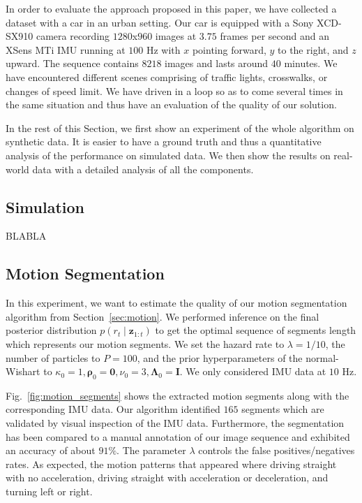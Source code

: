 In order to evaluate the approach proposed in this paper, we have collected
a dataset with a car in an urban setting. Our car is equipped with a Sony
XCD-SX910 camera recording $1280$x$960$ images at $3.75$ frames per second and
an XSens MTi IMU running at $100$ Hz with $x$ pointing forward, $y$ to the
right, and $z$ upward. The sequence contains $8218$ images and lasts around $40$
minutes. We have encountered different scenes comprising of traffic lights,
crosswalks, or changes of speed limit. We have driven in a loop so as to come
several times in the same situation and thus have an evaluation of the quality
of our solution.

In the rest of this Section, we first show an experiment of the whole algorithm
on synthetic data. It is easier to have a ground truth and thus a quantitative
analysis of the performance on simulated data. We then show the results on
real-world data with a detailed analysis of all the components.

\subsection{Simulation}
BLABLA

\subsection{Motion Segmentation}
In this experiment, we want to estimate the quality of our motion segmentation
algorithm from Section~\ref{sec:motion}. We performed inference on the
final posterior distribution $p(r_t\mid \mathbf{z}_{1:t})$ to get the optimal
sequence of segments length which represents our motion segments. We set the
hazard rate to $\lambda=1/10$, the number of particles to $P=100$, and the prior
hyperparameters of the normal-Wishart to $\kappa_0=1,
\boldsymbol{\rho}_0=\mathbf{0},\nu_0=3,\boldsymbol{\Lambda}_0=\mathbf{I}$. We
only considered IMU data at $10$ Hz.

Fig.~\ref{fig:motion_segments} shows the extracted motion segments along with
the corresponding IMU data. Our algorithm identified $165$ segments which are
validated by visual inspection of the IMU data. Furthermore, the segmentation
has been compared to a manual annotation of our image sequence and exhibited an
accuracy of about $91\%$. The parameter $\lambda$ controls the false
positives/negatives rates. As expected, the motion patterns that appeared
where driving straight with no acceleration, driving straight with acceleration
or deceleration, and turning left or right.


